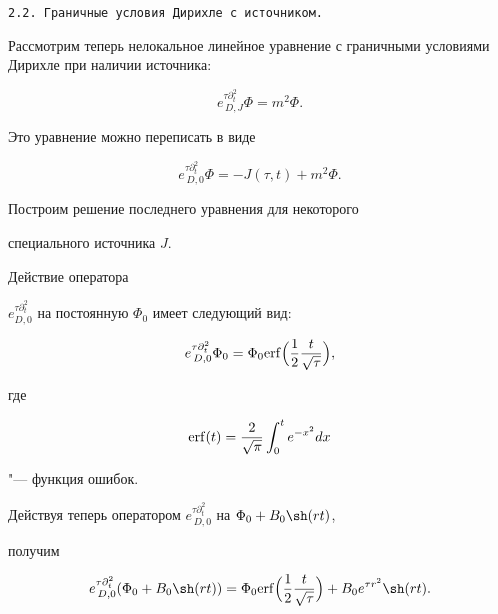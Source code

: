 {\tt 2.2. Граничные условия Дирихле с источником.}

Рассмотрим теперь не\-локальное линейное уравнение с граничными условиями Дирихле при наличии источника:

\begin{equation*}

e^{\tau\partial^2_t}_{\,D,J}\Phi=m^2\Phi. 


\end{equation*}

Это уравнение можно переписать в виде

\begin{equation*}

e^{\tau\partial^2_t}_{\,D,0}\Phi=-J(\tau,t)+m^2\Phi .


\end{equation*}

Построим решение последнего уравнения для некоторого

специального источника $J$.



Действие оператора

$e^{\tau\partial^2_t}_{D,0}$ на постоянную $\Phi_0$ имеет следующий вид:

\begin{equation*}

e^{\tau\partial^2_t}_{\,D,0}\Phi_0=

\Phi_0{\mathop{\rm erf}\nolimits}\Bigl(\frac{1}{2}\frac{t}{\sqrt{\tau}}\Bigr),

\end{equation*}

где 

\begin{equation*}


{\mathop{\rm erf}\nolimits}(t)=\frac{2}{\sqrt{\pi}}\int_0^te^{-x^2}dx

\end{equation*}

"--- функция ошибок.



Действуя теперь оператором $e^{\tau\partial^2_t}_{\,D,0}$ на $\Phi_0+B_0 \sh (rt)$,

получим

\begin{equation*}

e^{\tau\partial^2_t}_{\,D,0}(\Phi_0+B_0 \sh (rt))=

\Phi_0{\mathop{\rm erf}\nolimits}\Bigl(\frac{1}{2}\frac{t}{\sqrt{\tau}}\Bigr)+B_0e^{\tau r^2} \sh (rt).


\end{equation*}

